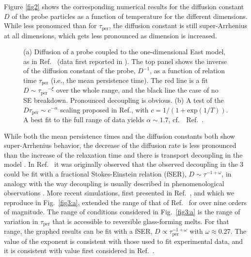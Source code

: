 \documentclass[showpacs,pre,aps,twocolumn,superscriptaddress]{revtex4-1}
\begin{document}
Figure \ref{fig2} shows the corresponding numerical results for the diffusion constant $D$ of the probe particles as a function of temperature for the different dimensions.  While less pronounced than for ${\tau}_{\text{per}}$, the diffusion constant is still super-Arrhenius at all dimensions, which gets less pronounced as dimension is increased. 



\begin{figure}[t]
 \begin{center}
     \hspace{-17pt}
     
 \end{center}
 \vspace{-20pt}
 \caption{\label{fig3}  
(a) Diffusion of a probe coupled to the one-dimensional East model, as in Ref.~\cite{Jung2004} (data first reported in \cite{Jung2013}). The top panel shows the inverse of the diffusion constant of the probe, $D^{-1}$, as a function of relation time $\tau_{\text{per}}$ (i.e., the mean persistence time). The red line is a fit $D\sim{\tau_{\text{per}}}^{-\xi}$ over the whole range, and the black line the case of no SE breakdown. Pronounced decoupling is obvious. (b) A test of the $D\tau_{\text{per}}\sim c^{-\alpha}$ scaling proposed in Ref., with $c=1/(1+\text{exp}(1/T))$. A best fit to the full range of data yields $\alpha \sim 1.7$, cf.~\ Ref.~\cite{Blondel2014}.
}
\end{figure}


While both the mean persistence times and the diffusion constants both show super-Arrhenius behavior, the decrease of the diffusion rate is less pronounced than the increase of the relaxation time and there is transport decoupling in the model \cite{Jung2004}.
In Ref.~\cite{Jung2004} it was originally observed that the observed decoupling in the 3 could be fit with a fractional Stokes-Einstein relation (fSER), $D\sim{\tau}^{-1+\omega}$, in analogy with the way decoupling is usually described in phenomenological observations \cite{Swallen2003}.  More recent simulations, first presented in Ref.~\cite{Jung2013}, and which we reproduce in 
Fig.~\ref{fig3:a}, extended the range of that of Ref.~\cite{Jung2004} for over nine orders of magnitude.
The range of conditions considered in Fig.~\ref{fig3:a} is the range of variation in $\tau_{\text{per}}$ that is accessible to reversible glass-forming melts.
For that range, the graphed results can be fit with a fSER,
$D \propto \tau_{\text{per}}^{-1+\omega}$ with $\omega \approx 0.27$.
The value of the exponent is consistent with those used to fit experimental data,\cite{Swallen2003}
and it is consistent with value first considered in Ref.~\cite{Jung2004}.  
\end{document}
